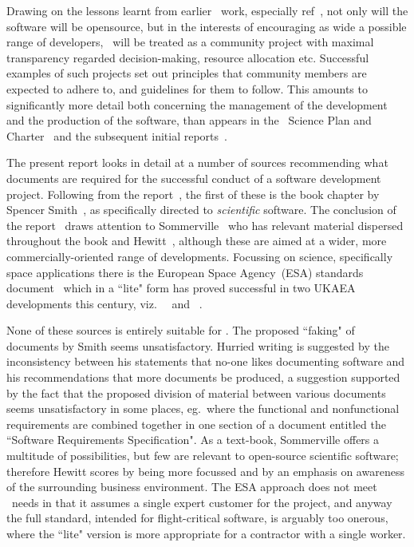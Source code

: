 Drawing on the lessons learnt from earlier \nep\ work, especially ref~\cite{y2re312}, not only will the
software will be opensource, but in the interests of encouraging as wide a possible range of developers,
\nep\ will be treated as a community project with maximal transparency regarded decision-making, resource allocation etc.
Successful examples of such projects set out principles that community members are expected to adhere to,
and guidelines for them to follow. This amounts to significantly more detail both concerning the
management of the development and the production of the software, than appears in the \nep\ Science Plan
and Charter~\cite{sciplan,charter} and the subsequent initial reports~\cite{y1re311,y1re331}. 

The present report looks in detail at a number of sources recommending what documents are required
for the successful conduct of a software development project. Following from the report~\cite{y1re311},
the first of these is the book chapter by Spencer Smith~\cite{Sm17Rati},
as specifically directed to \emph{scientific} software.
The conclusion of the report~\cite[\S\,3]{y2re312} draws attention to Sommerville~\cite{sommerville10}
who has relevant material dispersed throughout the book and Hewitt~\cite{hewittexc}, although these
are aimed at a wider, more commercially-oriented range of developments. Focussing on science,
specifically space applications
there is the European Space Agency~(ESA) standards document~\cite{ecss40exc} which in
a ``lite" form has proved successful in two 
UKAEA developments this century, viz.\ ~\cite{Su17FISP} and ~\cite{Wa15}.

None of these sources is entirely suitable for \nep. 
The proposed ``faking" of documents by Smith seems unsatisfactory. Hurried writing  is suggested
by the inconsistency
between his statements that no-one likes documenting software and his recommendations that more
documents be produced, a suggestion supported by the fact that the proposed division
of material between various documents seems unsatisfactory in some places, eg.\ where the
functional and nonfunctional requirements are combined together in one section of a document
entitled the ``Software Requirements Specification". As a text-book, Sommerville offers a multitude
of possibilities, but few are relevant to open-source scientific software; therefore Hewitt scores
by being more focussed and by an emphasis on awareness of the surrounding business environment.
The ESA approach does not meet \nep\ needs in that it assumes a single expert customer
for the project, and anyway
the full standard, intended for flight-critical software, is arguably too onerous, where the
``lite" version is more appropriate for a contractor with a single worker.

